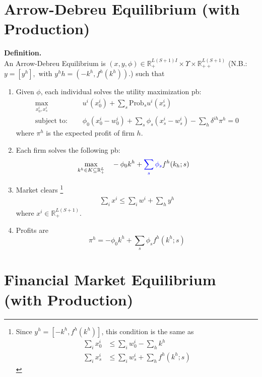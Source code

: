 \section{Arrow-Debreu Equilibrium (with Production)}
\noindent \textbf{Definition.} \\
An Arrow-Debreu Equilibrium is $(x, y, \phi) 
\in \mathbb{R}^{L(S+1)I}_{+} \times \Upsilon \times \mathbb{R}^{L(S+1)}_{++}$
(N.B.: $y = [y^h], \text{ with } y^hh = (-k^h, f^h(k^h))$.) such that 
\begin{enumerate}
    \item Given $\phi$, each individual solves the utility maximization pb:
    \begin{align*}
        \max_{x^i_0, x^i_s} \quad & u^i(x^i_0) + \sum_s \text{Prob}_s u^i(x^i_s) \\
        \text{subject to: } \quad & \phi_0 (x^i_0 - w^i_0) + \sum_s \phi_s (x^i_s - w^i_s)  - \sum_h \delta^{ih} \pi^h = 0 
    \end{align*}
    where $\pi^h$ is the expected profit of firm $h$.
    \item Each firm solves the following pb:
    \begin{align*}
        \max_{k^h \in K \subseteq \mathbb{R}^L_{+}} \quad & - \phi_0 k^h + \textcolor{blue}{\sum_s \phi_s} f^h(k_h;s)
    \end{align*}
    \item Market clears%
    \footnote{Since $y^h = [-k^h, f^h(k^h)]$, this condition is the same as 
    \begin{align*}
        \sum_i x_0^i & \leq \sum_i w_0^i - \sum_h k^h \\
        \sum_i x_s^i & \leq \sum_i w_s^i + \sum_h f^h(k^h;s)
    \end{align*}
    }
    \begin{align*}
        \sum_i x^i \leq \sum_i w^i + \sum_h y^h
    \end{align*}
    where $x^i \in \mathbb{R}^{L(S+1)}_{+}$.
    \item Profits are 
    \[
    \pi^h = - \phi_0 k^h + \sum_s \phi_s f^h(k^h;s)
    \]
\end{enumerate}

\clearpage
\section{Financial Market Equilibrium (with Production)}

